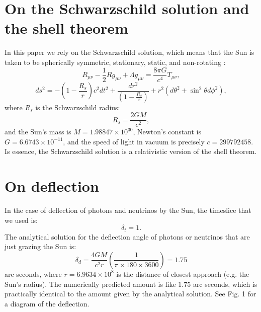 \documentclass[12pt]{article}
\begin{document}
\section{On the Schwarzschild solution and the shell theorem}

In this paper we rely on the Schwarzschild solution, which means that the Sun is taken to be spherically symmetric, stationary, static, and non-rotating \cite{einstein, misner, schutz, mcmahon}:
\begin{equation}
\label{efe}
R_{\mu\nu} - \frac{1}{2} R g_{\mu\nu} + \Lambda g_{\mu\nu} = \frac{8\pi G}{c^4} T_{\mu\nu},
\end{equation}
\begin{equation}
\label{schwarzschild_line_element}
ds^2 = -\left( 1 - \frac{R_{s}}{r} \right) c^2 dt^2 + \frac{dr^2}{\left( 1 - \frac{R_{s}}{r} \right)} + r^2 (d\theta^2 + \sin^2 \theta d\phi^2),
\end{equation}
where $R_{s}$ is the Schwarzschild radius:
\begin{equation}
\label{schwarzschild_radius}
R_{s} = \frac{2GM}{c^2},
\end{equation}
and the Sun's mass is $M = 1.98847 \times 10^{30}$, Newton's constant is $G = 6.6743 \times 10^{-11}$, and the speed of light in vacuum is precisely $c = 299792458$.
Is essence, the Schwarzschild solution is a relativistic version of the shell theorem.






\section{On deflection}

In the case of deflection of photons and neutrinos by the Sun, the timeslice that we used is:
\begin{equation}
\label{dt_1}
\delta_{t} = 1.
\end{equation}
The analytical solution for the deflection angle of photons or neutrinos that are just grazing the Sun is:
\begin{equation}
\label{delta_d}
\delta_{d} = \frac{4GM}{c^2 r} \left( \frac{1}{\pi \times 180 \times 3600} \right) = 1.75
\end{equation}
arc seconds, where $r = 6.9634 \times 10^8$ is the distance of closest approach (e.g. the Sun's radius).
The numerically predicted amount is like $1.75$ arc seconds, which is practically identical to the amount given by the analytical solution.
See Fig. 1 for a diagram of the deflection.
\end{document}
